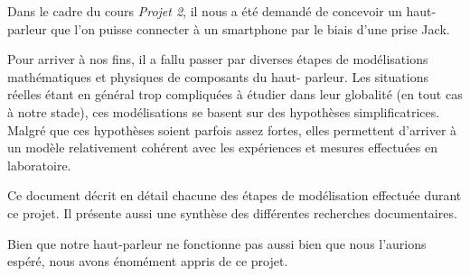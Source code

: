 

\begin{abstract-fr}
Dans le cadre du cours \textit{Projet 2}, il nous a été demandé
de concevoir un haut-parleur que l'on puisse connecter à un smartphone
par le biais d'une prise Jack.

Pour arriver à nos fins, il a fallu passer par diverses étapes
de modélisations mathématiques et physiques de composants du haut-
parleur. Les situations réelles étant en général trop compliquées à étudier
dans leur globalité (en tout cas à notre stade), ces modélisations se basent sur des 
hypothèses simplificatrices. Malgré que ces hypothèses soient parfois assez fortes, 
elles permettent d'arriver à un modèle relativement cohérent avec les expériences et
mesures effectuées en laboratoire.

Ce document décrit en détail chacune des étapes de modélisation effectuée durant
ce projet. Il présente aussi une synthèse des différentes recherches documentaires.

Bien que notre haut-parleur ne fonctionne pas aussi bien que nous l'aurions
espéré, nous avons énomément appris de ce projet.


\end{abstract-fr}


